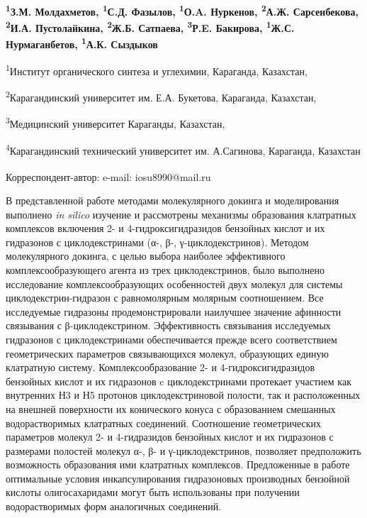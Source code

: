
\begin{articleheader}

{\bfseries
\textsuperscript{1}З.М. Молдахметов,
\textsuperscript{1}С.Д. Фазылов\textsuperscript{\envelope },
\textsuperscript{1}О.A. Нуркенов,
\textsuperscript{2}А.Ж. Сарсенбекова,
\textsuperscript{2}И.А. Пустолайкина,
\textsuperscript{2}Ж.Б. Сатпаева,
\textsuperscript{3}Р.E. Бакирова,
\textsuperscript{1}Ж.С. Нурмаганбетов,
\textsuperscript{1}А.К. Сыздыков
}
\end{articleheader}

\begin{affiliation}
\textsuperscript{1}Институт органического синтеза и углехимии, Караганда, Казахстан,

\textsuperscript{2}Карагандинский университет им. Е.А. Букетова, Караганда, Казахстан,

\textsuperscript{3}Медицинский университет Караганды, Казахстан,

\textsuperscript{4}Карагандинский технический университет им. А.Сагинова, Караганда, Казахстан

\raggedright \textsuperscript{\envelope }Корреспондент-автор: e-mail: iosu8990@mail.ru
\end{affiliation}

В представленной работе методами молекулярного докинга и моделирования
выполнено \emph{in silico} изучение и рассмотрены механизмы образования
клатратных комплексов включения 2- и 4-гидрок\-сигидразидов бензойных
кислот и их гидразонов с циклодекстринами (α-, β-, γ-циклодекстринов).
Методом молекулярного докинга, с целью выбора наиболее эффективного
комплексообразующего агента из трех циклодекстринов, было выполнено
исследование комплексообразующих особенностей двух молекул для системы
циклодекстрин-гидразон с равномолярным молярным соотношением. Все
исследуемые гидразоны продемонстрировали наилучшее значение афинности
связывания с β-циклодекстрином. Эффективность связывания исследуемых
гидразонов с циклодекстринами обеспечивается прежде всего соответствием
геометрических параметров связывающихся молекул, образующих единую
клатратную систему. Комплексообразование 2- и 4-гидроксигидразидов
бензойных кислот и их гидразонов c циклодекстринами протекает участием
как внутренних Н3 и Н5 протонов циклодекстриновой полости, так и
расположенных на внешней поверхности их конического конуса с
образованием смешанных водорастворимых клатратных соединений.
Соотношение геометрических параметров молекул 2- и 4-гидразидов
бензойных кислот и их гидразонов с размерами полостей молекул α-, β- и
γ-циклодекстринов, позволяет предположить возможность образования ими
клатратных комплексов. Предложенные в работе оптимальные условия
инкапсулирования гидразоновых производных бензойной кислоты
олигосахаридами могут быть использованы при получении водорастворимых
форм аналогичных соединений.

